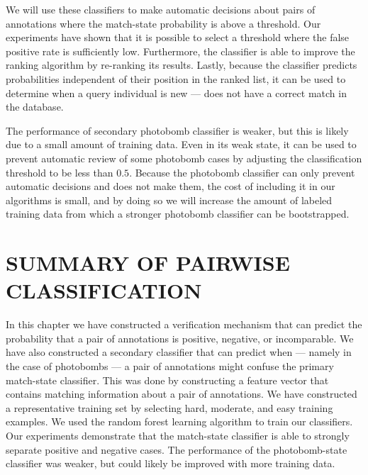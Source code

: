         We will use these classifiers to make automatic decisions about pairs of annotations where the
          match-state probability is above a threshold.
        Our experiments have shown that it is possible to select a threshold where the false positive rate is
          sufficiently low.
        Furthermore, the classifier is able to improve the ranking algorithm by re-ranking its results.
        Lastly, because the classifier predicts probabilities independent of their position in the ranked list,
          it can be used to determine when a query individual is new --- \ie{} does not have a correct match in the
          database.

        The performance of secondary photobomb classifier is weaker, but this is likely due to a small amount of
          training data.
        Even in its weak state, it can be used to prevent automatic review of some photobomb cases by adjusting
          the classification threshold to be less than $0.5$.
        Because the photobomb classifier can only prevent automatic decisions and does not make them, the cost of
          including it in our algorithms is small, and by doing so we will increase the amount of labeled training
          data from which a stronger photobomb classifier can be bootstrapped.


\section{SUMMARY OF PAIRWISE CLASSIFICATION}\label{sec:pairconclusion}

    In this chapter we have constructed a verification mechanism that can predict the probability that a pair of
      annotations is positive, negative, or incomparable.
    We have also constructed a secondary classifier that can predict when --- namely in the case of photobombs
      --- a pair of annotations might confuse the primary match-state classifier.
    This was done by constructing a feature vector that contains matching information about a pair of
      annotations.
    We have constructed a representative training set by selecting hard, moderate, and easy training examples.
    We used the random forest learning algorithm to train our classifiers.
    Our experiments demonstrate that the match-state classifier is able to strongly separate positive and
      negative cases.
    The performance of the photobomb-state classifier was weaker, but could likely be improved with more training
      data.

